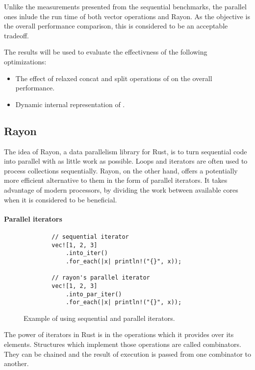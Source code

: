 Unlike the measurements presented from the sequential benchmarks, the parallel ones inlude the run time of both vector operations and Rayon. As the objective is the overall performance comparison, this is considered to be an acceptable tradeoff. 

The results will be used to evaluate the effectivness of the following optimizations:
\begin{itemize}
    \item The effect of relaxed concat and split operations of \rrbvec{} on the overall performance. 
    \item Dynamic internal representation of \pvec{}.     
\end{itemize}

\subsection{Rayon}
The idea of Rayon, a data parallelism library for Rust, is to turn sequential code into parallel with as little work as possible. Loops and iterators are often used to process collections sequentially. Rayon, on the other hand, offers a potentially more efficient alternative to them in the form of parallel iterators. It takes advantage of modern processors, by dividing the work between available cores when it is considered to be beneficial. 

\paragraph*{Parallel iterators}

\begin{figure}[!htbp] 
    \centering

    \begin{verbatim}
        // sequential iterator
        vec![1, 2, 3]
            .into_iter()
            .for_each(|x| println!("{}", x));

        // rayon's parallel iterator
        vec![1, 2, 3]
            .into_par_iter()
            .for_each(|x| println!("{}", x));
    \end{verbatim}

    \caption{Example of using sequential and parallel iterators.}
    \label{fig:par-iter-example}
\end{figure}

The power of iterators in Rust is in the operations which it provides over its elements. Structures which implement those operations are called combinators. They can be chained and the result of execution is passed from one combinator to another. 

